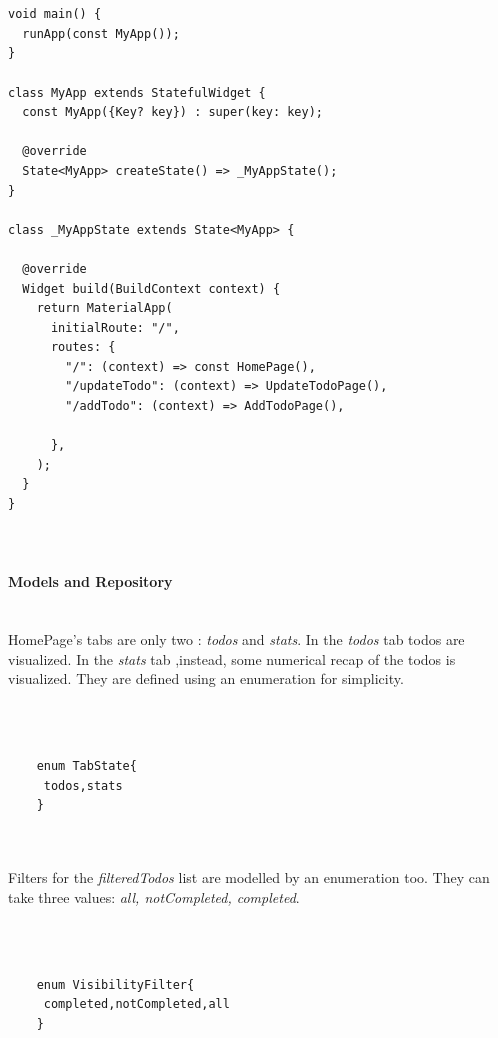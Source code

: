 		\mbox{}\\
		 \mbox{}
	\begin{verbatim}
	
void main() {
  runApp(const MyApp());
}

class MyApp extends StatefulWidget {
  const MyApp({Key? key}) : super(key: key);

  @override
  State<MyApp> createState() => _MyAppState();
}

class _MyAppState extends State<MyApp> {

  @override
  Widget build(BuildContext context) {
    return MaterialApp(
      initialRoute: "/",
      routes: {
        "/": (context) => const HomePage(),
        "/updateTodo": (context) => UpdateTodoPage(),
        "/addTodo": (context) => AddTodoPage(),

      },
    );
  }
}

	
	\end{verbatim}
	\paragraph{Models and Repository} \mbox{} \\
	\label{par:todo_app_models_and_repository}
HomePage's tabs are only two : \textit{todos} and \textit{stats}. In the \textit{todos} tab todos are visualized. In the \textit{stats} tab ,instead, some numerical recap of the todos is visualized. They are defined using an enumeration for simplicity.

	\mbox{}\\
	
	
	 \mbox{}
	\begin{verbatim}
	
	enum TabState{
	 todos,stats
	}
	
	
	\end{verbatim}
	
	\mbox{}
	
Filters for the \textit{filteredTodos} list are modelled by an enumeration too. They can take three values: \textit{all, notCompleted, completed}.
	
	\mbox{}\\
	
	 \mbox{}
	\begin{verbatim}
	
	enum VisibilityFilter{
	 completed,notCompleted,all
	}
	
	
	\end{verbatim}
	
